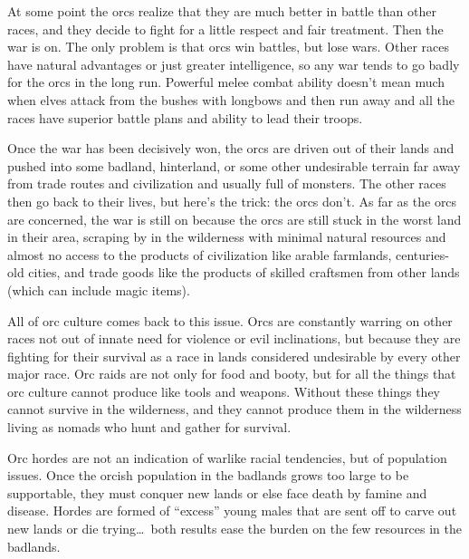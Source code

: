 At some point the orcs realize that they are much better in battle than other races, and they decide to fight for a little respect and fair treatment. Then the war is on. The only problem is that orcs win battles, but lose wars. Other races have natural advantages or just greater intelligence, so any war tends to go badly for the orcs in the long run. Powerful melee combat ability doesn't mean much when elves attack from the bushes with longbows and then run away and all the races have superior battle plans and ability to lead their troops.

Once the war has been decisively won, the orcs are driven out of their lands and pushed into some badland, hinterland, or some other undesirable terrain far away from trade routes and civilization and usually full of monsters. The other races then go back to their lives, but here's the trick: the orcs don't. As far as the orcs are concerned, the war is still on because the orcs are still stuck in the worst land in their area, scraping by in the wilderness with minimal natural resources and almost no access to the products of civilization like arable farmlands, centuries-old cities, and trade goods like the products of skilled craftsmen from other lands (which can include magic items).

All of orc culture comes back to this issue. Orcs are constantly warring on other races not out of innate need for violence or evil inclinations, but because they are fighting for their survival as a race in lands considered undesirable by every other major race. Orc raids are not only for food and booty, but for all the things that orc culture cannot produce like tools and weapons. Without these things they cannot survive in the wilderness, and they cannot produce them in the wilderness living as nomads who hunt and gather for survival.

Orc hordes are not an indication of warlike racial tendencies, but of population issues. Once the orcish population in the badlands grows too large to be supportable, they must conquer new lands or else face death by famine and disease. Hordes are formed of ``excess'' young males that are sent off to carve out new lands or die trying\ldots\  both results ease the burden on the few resources in the badlands.

